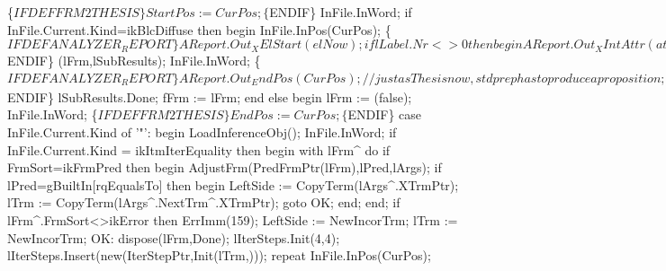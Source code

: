    \{$IFDEF FRM2THESIS\}   
   StartPos := CurPos;
   \{$ENDIF\}
   InFile.InWord;
   if InFile.Current.Kind=ikBlcDiffuse then
   begin
      InFile.InPos(CurPos);
      \{$IFDEF ANALYZER_REPORT\}
      AReport.Out_XElStart(elNow);
      if lLabel.Nr <> 0 then
      begin 
         AReport.Out_XIntAttr(atNr, lLabel.Nr);
         AReport.Out_XIntAttr(atVid, lLabId);
      end;
      AReport.Out_PosAsAttrs(CurPos);
      AReport.Out_XAttrEnd;
      \{$ENDIF\}
      (lFrm,lSubResults); InFile.InWord;
      \{$IFDEF ANALYZER_REPORT\}
      AReport.Out_EndPos(CurPos);
      // just as Thesis now, stdprep has to produce a proposition;
      // the temporary theses are printed in reverse order, so that they
      // correspond to the order of skeleton items;
      AReport.Out_XElStart0(elBlockThesis);
      for z := lSubResults.Count-1 downto 0 do
      begin
         AReport.Out_XElStart0(elThesis);
         AReport.Out_Formula(lSubResults.Items^[z]);
         AReport.Out_NatFunc(elThesisExpansions, EmptyNatFunc); 
         AReport.Out_XElEnd(elThesis);
      end;
      AReport.Out_Formula(lFrm);
      AReport.Out_XElEnd(elBlockThesis);
      AReport.Out_XElEnd(elNow);
      \{$ENDIF\}
      lSubResults.Done;
      fFrm := lFrm;
   end
   else
   begin
      lFrm := (false);
      InFile.InWord;
      \{$IFDEF FRM2THESIS\}   
      EndPos := CurPos;
      \{$ENDIF\}
      case InFile.Current.Kind of
         '"':
            begin
               LoadInferenceObj();
               InFile.InWord;
               if InFile.Current.Kind = ikItmIterEquality then
               begin
                  with lFrm^ do
                     if FrmSort=ikFrmPred then
                     begin AdjustFrm(PredFrmPtr(lFrm),lPred,lArgs);
                     if lPred=gBuiltIn[rqEqualsTo] then
                     begin
                        LeftSide := CopyTerm(lArgs^.XTrmPtr);
                        lTrm := CopyTerm(lArgs^.NextTrm^.XTrmPtr);
                        goto OK;
                     end;
                     end;
                  if lFrm^.FrmSort<>ikError then ErrImm(159);     
                  LeftSide := NewIncorTrm; lTrm := NewIncorTrm;
                  OK:
                     dispose(lFrm,Done);
                  lIterSteps.Init(4,4);
                  lIterSteps.Insert(new(IterStepPtr,Init(lTrm,)));
                  repeat
                     InFile.InPos(CurPos);
